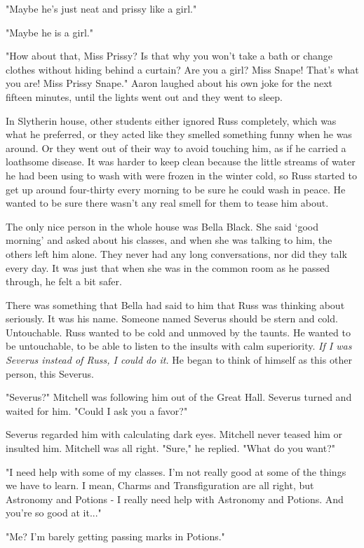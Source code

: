 \documentclass[a4paper,11pt]{article}
\begin{document}
"Maybe he's just neat and prissy like a girl."

"Maybe he is a girl."

"How about that, Miss Prissy? Is that why you won't take a bath or change clothes without hiding behind a curtain? Are you a girl? Miss Snape! That's what you are! Miss Prissy Snape." Aaron laughed about his own joke for the next fifteen minutes, until the lights went out and they went to sleep.

In Slytherin house, other students either ignored Russ completely, which was what he preferred, or they acted like they smelled something funny when he was around. Or they went out of their way to avoid touching him, as if he carried a loathsome disease. It was harder to keep clean because the little streams of water he had been using to wash with were frozen in the winter cold, so Russ started to get up around four-thirty every morning to be sure he could wash in peace. He wanted to be sure there wasn't any real smell for them to tease him about.

The only nice person in the whole house was Bella Black. She said `good morning' and asked about his classes, and when she was talking to him, the others left him alone. They never had any long conversations, nor did they talk every day. It was just that when she was in the common room as he passed through, he felt a bit safer.

There was something that Bella had said to him that Russ was thinking about seriously. It was his name. Someone named Severus should be stern and cold. Untouchable. Russ wanted to be cold and unmoved by the taunts. He wanted to be untouchable, to be able to listen to the insults with calm superiority. \emph{If I was Severus instead of Russ, I could do it.} He began to think of himself as this other person, this Severus.

"Severus?" Mitchell was following him out of the Great Hall. Severus turned and waited for him. "Could I ask you a favor?"

Severus regarded him with calculating dark eyes. Mitchell never teased him or insulted him. Mitchell was all right. "Sure," he replied. "What do you want?"

"I need help with some of my classes. I'm not really good at some of the things we have to learn. I mean, Charms and Transfiguration are all right, but Astronomy and Potions - I really need help with Astronomy and Potions. And you're so good at it..."

"Me? I'm barely getting passing marks in Potions."
\end{document}
